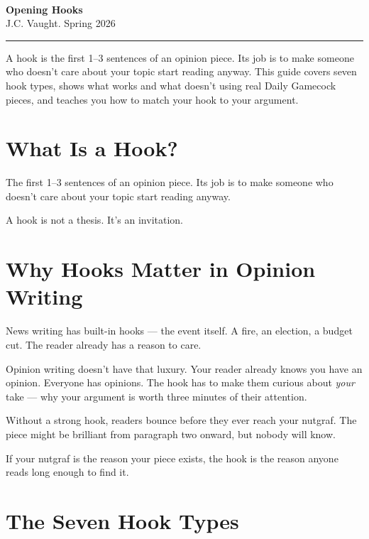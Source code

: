 \documentclass[12pt]{article}
\newcommand{\doctitle}{%
    \noindent{\LARGE\bfseries Daily Gamecock \textit{Opinion}}\\[2pt]
    {\LARGE\bfseries Opening Hooks}\\[4pt]
    {\normalsize J.C. Vaught. Spring 2026}\\[-2pt]
    \noindent\rule{\textwidth}{1pt}
    \vspace{8pt}
}
\begin{document}
\thispagestyle{plain}

\doctitle

\begin{keybox}
A hook is the first 1--3 sentences of an opinion piece. Its job is to make someone who doesn't care about your topic start reading anyway. This guide covers seven hook types, shows what works and what doesn't using real Daily Gamecock pieces, and teaches you how to match your hook to your argument.
\end{keybox}

\section*{What Is a Hook?}

The first 1--3 sentences of an opinion piece. Its job is to make someone who doesn't care about your topic start reading anyway.

A hook is not a thesis. It's an invitation.

\section*{Why Hooks Matter in Opinion Writing}

\begin{keybox}
News writing has built-in hooks --- the event itself. A fire, an election, a budget cut. The reader already has a reason to care.

Opinion writing doesn't have that luxury. Your reader already knows you have an opinion. Everyone has opinions. The hook has to make them curious about \textit{your} take --- why your argument is worth three minutes of their attention.

Without a strong hook, readers bounce before they ever reach your nutgraf. The piece might be brilliant from paragraph two onward, but nobody will know.
\end{keybox}

\begin{tipbox}[Remember]
If your nutgraf is the reason your piece exists, the hook is the reason anyone reads long enough to find it.
\end{tipbox}

\section*{The Seven Hook Types}
\end{document}
